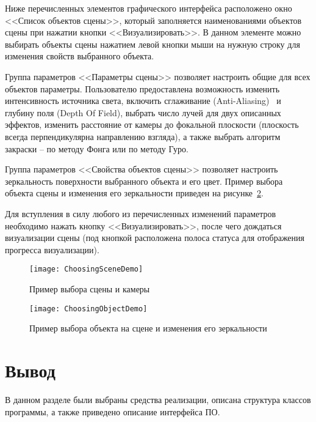Ниже перечисленных элементов графического интерфейса расположено окно <<Список объектов сцены>>, который заполняется наименованиями объектов сцены при нажатии кнопки <<Визуализировать>>. В данном элементе можно выбирать объекты сцены нажатием левой кнопки мыши на нужную строку для изменения свойств выбранного объекта.

Группа параметров <<Параметры сцены>> позволяет настроить общие для всех объектов параметры. Пользователю предоставлена возможность изменить интенсивность источника света, включить сглаживание (Anti-Aliasing)~\cite{Anti-aliasing} и глубину поля (Depth Of Field), выбрать число лучей для двух описанных эффектов, изменить расстояние от камеры до фокальной плоскости (плоскость всегда перпендикулярна направлению взгляда), а также выбрать алгоритм закраски -- по методу Фонга или по методу Гуро.

Группа параметров <<Свойства объектов сцены>> позволяет настроить зеркальность поверхности выбранного объекта и его цвет. Пример выбора объекта сцены и изменения его зеркальности приведен на рисунке~\ref{fig:ChoosingObjectDemo}.

Для вступления в силу любого из перечисленных изменений параметров необходимо нажать кнопку <<Визуализировать>>, после чего дождаться визуализации сцены (под кнопкой расположена полоса статуса для отображения прогресса визуализации).

\begin{figure}[H]
	\centering
	\texttt{[image: ChoosingSceneDemo]}
	\caption{Пример выбора сцены и камеры}
	\label{fig:ChoosingSceneDemo}
\end{figure}

\begin{figure}[H]
	\centering
	\texttt{[image: ChoosingObjectDemo]}
	\caption{Пример выбора объекта на сцене и изменения его зеркальности}
	\label{fig:ChoosingObjectDemo}
\end{figure}

\section{Вывод}
В данном разделе были выбраны средства реализации, описана структура классов программы, а также приведено описание интерфейса ПО.

\clearpage
